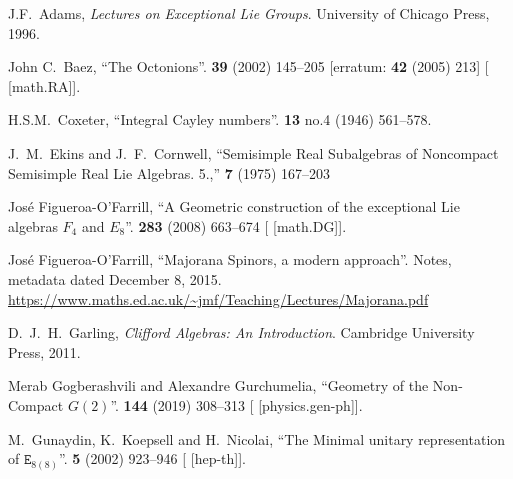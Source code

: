 \begin{thebibliography}{99}
\footnotesize%

J.F.\ Adams,
\textit{Lectures on Exceptional Lie Groups}.
University of Chicago Press, 1996.

John C.~Baez,
``The Octonions''.
 \textbf{39} (2002) 145--205
[erratum:  \textbf{42} (2005) 213]
{\tt{}}
[ [math.RA]].

H.S.M.~Coxeter,
``Integral Cayley numbers''.
 \textbf{13} no.4 (1946) 561--578.
{\tt{}}

J.~M.~Ekins and J.~F.~Cornwell,
``Semisimple Real Subalgebras of Noncompact Semisimple Real Lie Algebras. 5.,''
 \textbf{7} (1975) 167--203
{\tt{}}


Jos\'e Figueroa-O'Farrill,
``A Geometric construction of the exceptional Lie algebras $F_{4}$ and $E_{8}$''.
 \textbf{283} (2008) 663--674
{\tt{}}
[ [math.DG]].

Jos\'e Figueroa-O'Farrill,
``Majorana Spinors, a modern approach''.
Notes, metadata dated December 8, 2015.
\url{https://www.maths.ed.ac.uk/~jmf/Teaching/Lectures/Majorana.pdf}

  
D.~J.~H.~Garling,
\textit{Clifford Algebras: An Introduction}.
Cambridge University Press, 2011.

Merab Gogberashvili and Alexandre Gurchumelia,
``Geometry of the Non-Compact $G(2)$''.
 \textbf{144} (2019) 308--313
{\tt{}}
[ [physics.gen-ph]].

M.~Gunaydin, K.~Koepsell and H.~Nicolai,
``The Minimal unitary representation of $\mathtt{E}_{8(8)}$''.
 \textbf{5} (2002) 923--946
{\tt{}}
[ [hep-th]].


\end{thebibliography}
